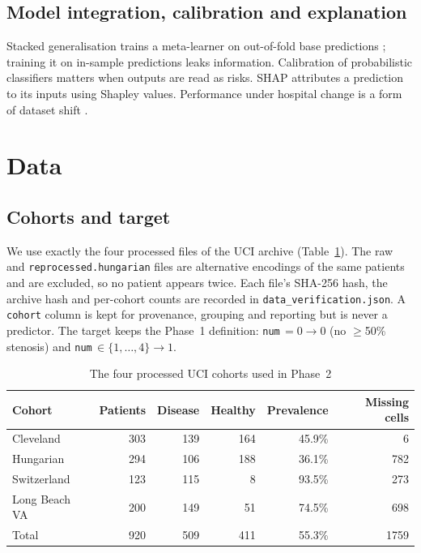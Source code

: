 \documentclass[conference]{IEEEtran}
\newcommand{\code}[1]{\texttt{\small #1}}
\begin{document}
\subsection{Model integration, calibration and explanation}
Stacked generalisation trains a meta-learner on out-of-fold base predictions \cite{wolpert,breiman_stack,superlearner}; training it on in-sample predictions leaks information. Calibration of probabilistic classifiers \cite{niculescu,guo} matters when outputs are read as risks. SHAP \cite{shap} attributes a prediction to its inputs using Shapley values. Performance under hospital change is a form of dataset shift \cite{datasetshift}.

\section{Data}
\subsection{Cohorts and target}
We use exactly the four processed files of the UCI archive (Table~\ref{tab:cohorts}). The raw and \code{reprocessed.hungarian} files are alternative encodings of the same patients and are excluded, so no patient appears twice. Each file's SHA-256 hash, the archive hash and per-cohort counts are recorded in \code{data\_verification.json}. A \code{cohort} column is kept for provenance, grouping and reporting but is never a predictor. The target keeps the Phase~1 definition: \code{num}$\,=0 \rightarrow 0$ (no $\geq$50\% stenosis) and \code{num}$\,\in\{1,\dots,4\} \rightarrow 1$.

\begin{table}[t]
\caption{The four processed UCI cohorts used in Phase~2}
\label{tab:cohorts}
\centering
\footnotesize
\setlength{\tabcolsep}{4pt}
\begin{tabular}{lrrrrr}
\toprule
Cohort & Patients & Disease & Healthy & Prevalence & Missing cells \\
\midrule
Cleveland & 303 & 139 & 164 & 45.9\% & 6 \\
Hungarian & 294 & 106 & 188 & 36.1\% & 782 \\
Switzerland & 123 & 115 & 8 & 93.5\% & 273 \\
Long Beach VA & 200 & 149 & 51 & 74.5\% & 698 \\
\midrule
Total & 920 & 509 & 411 & 55.3\% & 1759 \\
\bottomrule
\end{tabular}
\end{table}
\end{document}

